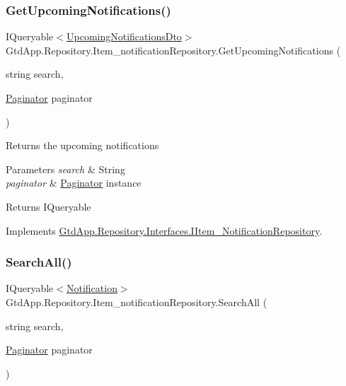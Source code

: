 \subsubsection{\texorpdfstring{Get\+Upcoming\+Notifications()}{GetUpcomingNotifications()}}
{\footnotesize\ttfamily I\+Queryable$<$\mbox{\hyperlink{class_gtd_app_1_1_data_1_1_dto_1_1_upcoming_notifications_dto}{Upcoming\+Notifications\+Dto}}$>$ Gtd\+App.\+Repository.\+Item\+\_\+notification\+Repository.\+Get\+Upcoming\+Notifications (\begin{DoxyParamCaption}\item[{string}]{search,  }\item[{\mbox{\hyperlink{class_gtd_app_1_1_repository_1_1_paginator}{Paginator}}}]{paginator }\end{DoxyParamCaption})}



Returns the upcoming notifications 


\begin{DoxyParams}{Parameters}
{\em search} & String\\
\hline
{\em paginator} & \mbox{\hyperlink{class_gtd_app_1_1_repository_1_1_paginator}{Paginator}} instance\\
\hline
\end{DoxyParams}
\begin{DoxyReturn}{Returns}
I\+Queryable
\end{DoxyReturn}


Implements \mbox{\hyperlink{interface_gtd_app_1_1_repository_1_1_interfaces_1_1_i_item___notification_repository_aabde198f24c18ac864ceb40309f634c8}{Gtd\+App.\+Repository.\+Interfaces.\+I\+Item\+\_\+\+Notification\+Repository}}.

\mbox{\label{class_gtd_app_1_1_repository_1_1_item__notification_repository_a6a06b004e4547aeb770266b856d1bd95}} 
\subsubsection{\texorpdfstring{Search\+All()}{SearchAll()}}
{\footnotesize\ttfamily I\+Queryable$<$\mbox{\hyperlink{class_gtd_app_1_1_data_1_1_notification}{Notification}}$>$ Gtd\+App.\+Repository.\+Item\+\_\+notification\+Repository.\+Search\+All (\begin{DoxyParamCaption}\item[{string}]{search,  }\item[{\mbox{\hyperlink{class_gtd_app_1_1_repository_1_1_paginator}{Paginator}}}]{paginator }\end{DoxyParamCaption})}




